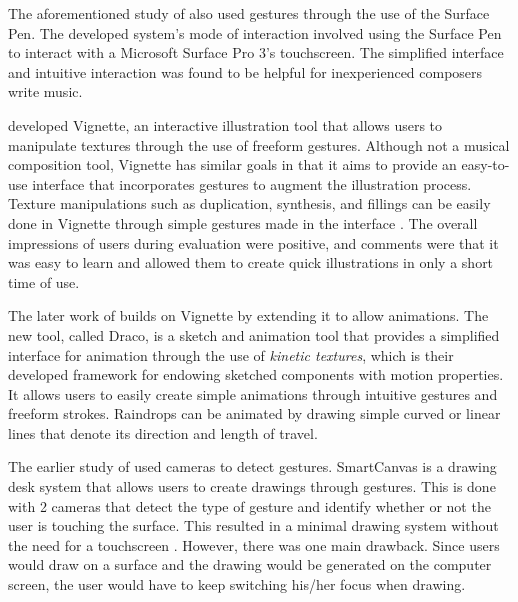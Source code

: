The aforementioned study of \citet{kikuchi2016music} also used gestures through the use of the Surface Pen. The developed system's mode of interaction involved using the Surface Pen to interact with a Microsoft Surface Pro 3's touchscreen. The simplified interface and intuitive interaction was found to be helpful for inexperienced composers write music.


\citeauthor{kazi2012vignette} developed Vignette, an interactive illustration tool that allows users to manipulate textures through the use of freeform gestures. Although not a musical composition tool, Vignette has similar goals in that it aims to provide an easy-to-use interface that incorporates gestures to augment the illustration process. Texture manipulations such as duplication, synthesis, and fillings can be easily done in Vignette through simple gestures made in the interface \citep{kazi2012vignette}. The overall impressions of users during evaluation were positive, and comments were that it was easy to learn and allowed them to create quick illustrations in only a short time of use.

The later work of \citet{kazi2014draco} builds on Vignette by extending it to allow animations. The new tool, called Draco, is a sketch and animation tool that provides a simplified interface for animation through the use of \textit{kinetic textures}, which is their developed framework for endowing sketched components with motion properties. It allows users to easily create simple animations through intuitive gestures and freeform strokes. Raindrops can be animated by drawing simple curved or linear lines that denote its direction and length of travel.

The earlier study of \citep{mo2005smartcanvas} used cameras to detect gestures. SmartCanvas is a drawing desk system that allows users to create drawings through gestures. This is done with 2 cameras that detect the type of gesture and identify whether or not the user is touching the surface. This resulted in a minimal drawing system without the need for a touchscreen \citep{mo2005smartcanvas}. However, there was one main drawback. Since users would draw on a surface and the drawing would be generated on the computer screen, the user would have to keep switching his/her focus when drawing.

